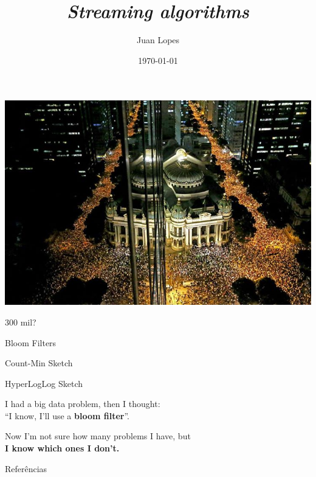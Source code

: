 \documentclass[14pt]{beamer}
\title{\emph{Streaming algorithms}}
\author{Juan Lopes}
\date{\today}
\begin{document}
\begin{frame}
    \maketitle
\end{frame}

\begin{frame}
    \includegraphics[scale=0.4]{figures/riobranco.jpg}

    \smallskip
    
     300 mil?
\end{frame}

\begin{frame}
    Bloom Filters \\ {\tiny\cite{bloom1970space}}

    \bigskip

    Count-Min Sketch \\ {\tiny\cite{cormode2004improved}}
    
    \bigskip
    
    HyperLogLog Sketch \\ {\tiny\cite{flajolet2008hyperloglog}}
\end{frame}

\begin{frame}
I had a big data problem, then I thought: \\ ``I know, I'll use a {\bf bloom filter}''. 

\bigskip

Now I'm not sure how many problems I have, but \\ {\bf I know which ones I don't.}
\end{frame}




\begin{frame}{Referências}
\fontsize{8}{2}


\end{frame}
\end{document}
